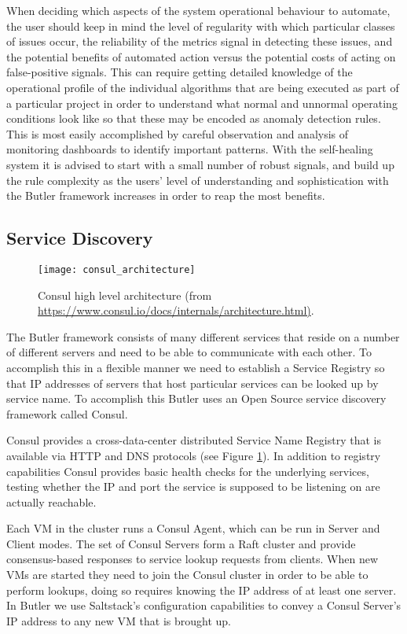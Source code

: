 When deciding which aspects of the system operational behaviour to automate, the user should keep in mind the level of regularity with which particular classes of issues occur, the reliability of the metrics signal in detecting these issues, and the potential benefits of automated action versus the potential costs of acting on false-positive signals. This can require getting detailed knowledge of the operational profile of the individual algorithms that are being executed as part of a particular project in order to understand what normal and unnormal operating conditions look like so that these may be encoded as anomaly detection rules. This is most easily accomplished by careful observation and analysis of monitoring dashboards to identify important patterns. With the self-healing system it is advised to start with a small number of robust signals, and build up the rule complexity as the users' level of understanding and sophistication with the Butler framework increases in order to reap the most benefits.

\subsection{Service Discovery} 
\label{sec:design_consul}

\begin{figure}[h]
  \texttt{[image: consul\_architecture]}
  \centering
  \caption {Consul high level architecture (from \url{https://www.consul.io/docs/internals/architecture.html)}.}
  \label{fig:consul_architecture}
  \end{figure} 

The Butler framework consists of many different services that reside on a number of different servers and need to be able to communicate with each other. To accomplish this in a flexible manner we need to establish a Service Registry so that IP addresses of servers that host particular services can be looked up by service name. To accomplish this Butler uses an Open Source service discovery framework called Consul\autocite{Consul_by_HashiCorp}.

Consul provides a cross-data-center distributed Service Name Registry that is available via HTTP and DNS protocols (see Figure \ref{fig:consul_architecture}). In addition to registry capabilities Consul provides basic health checks for the underlying services, testing whether the IP and port the service is supposed to be listening on are actually reachable.

Each VM in the cluster runs a Consul Agent, which can be run in Server and Client modes. The set of Consul Servers form a Raft cluster and provide consensus-based responses to service lookup requests from clients. When new VMs are started they need to join the Consul cluster in order to be able to perform lookups, doing so requires knowing the IP address of at least one server. In Butler we use Saltstack's configuration capabilities to convey a Consul Server's IP address to any new VM that is brought up. 

